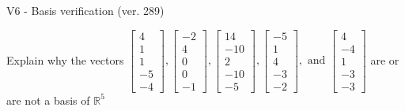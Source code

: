 \begin{exercise}
  \begin{exerciseTitle}V6 - Basis verification (ver. 289)\end{exerciseTitle}
  \begin{exerciseStatement}
    Explain why the vectors \(\left[\begin{array}{r}
4 \\
1 \\
1 \\
-5 \\
-4
\end{array}\right] , \left[\begin{array}{r}
-2 \\
4 \\
0 \\
0 \\
-1
\end{array}\right] , \left[\begin{array}{r}
14 \\
-10 \\
2 \\
-10 \\
-5
\end{array}\right] , \left[\begin{array}{r}
-5 \\
1 \\
4 \\
-3 \\
-2
\end{array}\right] , \text{ and } \left[\begin{array}{r}
4 \\
-4 \\
1 \\
-3 \\
-3
\end{array}\right]\) are or are not a basis of \(\mathbb{R}^5\)	



\end{exerciseStatement}
\end{exercise}
